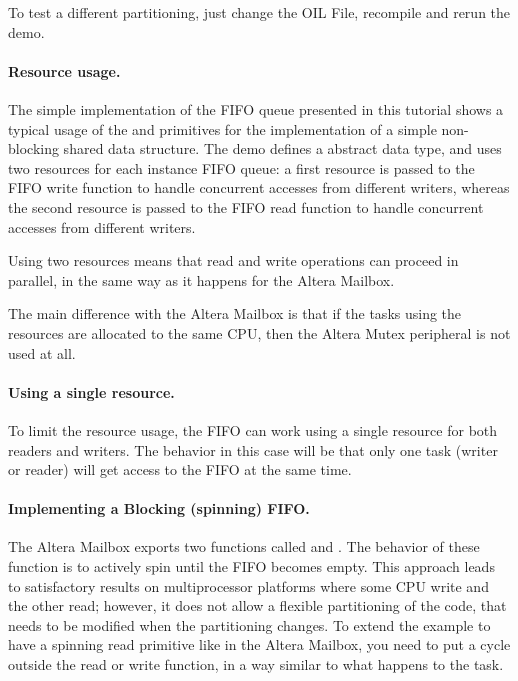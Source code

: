 To test a different partitioning, just change the OIL File, recompile
and rerun the demo.

\paragraph{Resource usage.}
The simple implementation of the FIFO queue presented in this tutorial
shows a typical usage of the  and 
primitives for the implementation of a simple non-blocking shared data
structure. The demo defines a  abstract data type, and
uses two resources for each instance FIFO queue: a first resource is
passed to the FIFO write function to handle concurrent accesses from
different writers, whereas the second resource is passed to the FIFO
read function to handle concurrent accesses from different writers.

Using two resources means that read and write operations can proceed
in parallel, in the same way as it happens for the Altera Mailbox.

The main difference with the Altera Mailbox is that if the tasks using
the resources are allocated to the same CPU, then the Altera
Mutex peripheral is not used at all.

\paragraph{Using a single resource.}
To limit the resource usage, the FIFO can work using a single resource
for both readers and writers. The behavior in this case will be that
only one task (writer or reader) will get access to the FIFO at the
same time.

\paragraph{Implementing a Blocking (spinning) FIFO.}
The Altera Mailbox exports two functions called
 and
. The behavior of these function is to
actively spin until the FIFO becomes empty.  This approach leads to
satisfactory results on multiprocessor platforms where some CPU write
and the other read; however, it does not allow a flexible partitioning
of the code, that needs to be modified when the partitioning
changes. To extend the example to have a spinning read primitive like
in the Altera Mailbox, you need to put a cycle outside the read or
write function, in a way similar to what happens to the
 task.

